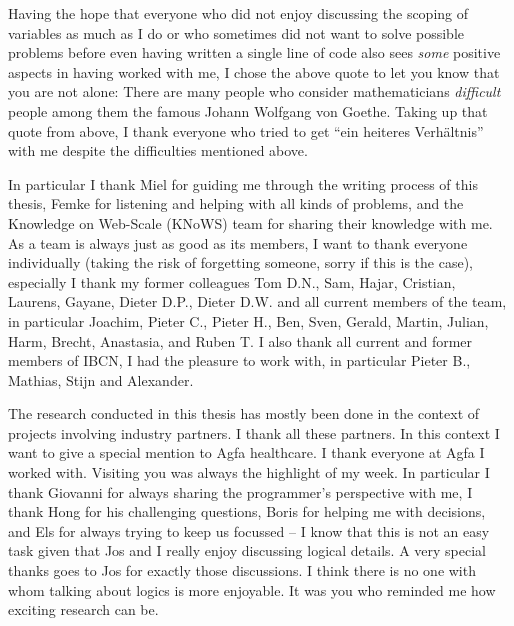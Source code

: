 Having the hope that everyone 
who  did not enjoy discussing  the scoping of variables as much as I do or who sometimes did not want to solve possible problems before even having written a single line of code
also sees \emph{some} positive aspects in having worked with me, 
I chose the above quote 
to let you know that you are not alone: There are many people who consider  mathematicians \emph{difficult} people among them the famous Johann Wolfgang von Goethe. 
% 
Taking up that quote from above, I thank everyone who tried to get ``ein heiteres Verh\"altnis'' with me despite the difficulties mentioned above.


In particular I thank Miel for guiding me through the writing process of this thesis, Femke for listening and helping with all kinds of problems, and the Knowledge on Web-Scale (KNoWS) team for 
sharing their knowledge with me.
As a team is always just as good as its members, I want to thank everyone individually (taking the risk of forgetting someone, sorry if this is the case), especially I thank my former colleagues Tom D.N., 
Sam, Hajar, Cristian, Laurens, Gayane, Dieter D.P., Dieter D.W.
and all current members of the team, in particular Joachim,
Pieter C.,
Pieter H.,
Ben, Sven, Gerald, Martin, Julian, Harm, Brecht, Anastasia, and Ruben T.
I also thank  all current and former members of IBCN, I had the pleasure to work with, in particular Pieter B., Mathias, Stijn and Alexander.

The research conducted in this thesis has mostly been done in the context of projects involving industry partners. I thank all these partners. In this context I want to give a special mention to Agfa healthcare.
I thank everyone at Agfa I worked with.
Visiting you was always the highlight of my week. In particular I thank Giovanni for always sharing the programmer's perspective with me,
I thank Hong  for his challenging questions, Boris for helping me with decisions, and Els for always trying to keep us focussed -- I know that this is not an easy 
task given that Jos and I really enjoy discussing logical details. 
A very special thanks goes to Jos for exactly those discussions. I think there is no one with whom talking about logics is more enjoyable.
It was you who reminded me how exciting research can be.

